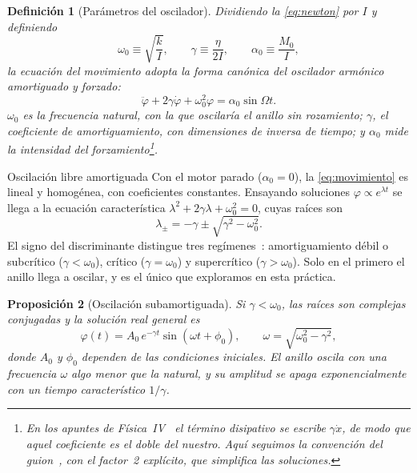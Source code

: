 \documentclass[a4paper,11pt]{amsart}
\makeatletter
\def\subsection{\@startsection{subsection}{2}%
  \z@{.9\linespacing\@plus.6\linespacing}{.3\linespacing}%
  {\normalfont\bfseries\color{azulprof}}}
\numberwithin{equation}{section}
\newcommand{\wz}{\omega_0}                    %
\newcommand{\wa}{\omega}                      %
\theoremstyle{cienplano}
\newtheorem{proposicion}{Proposición}[section]
\theoremstyle{ciendef}
\newtheorem{definicion}[proposicion]{Definición}
\theoremstyle{cienobs}
\makeatother
\begin{document}
\begin{definicion}[Parámetros del oscilador]\label{def:parametros}
Dividiendo la \cref{eq:newton} por $I$ y definiendo
\begin{equation}\label{eq:parametros}
  \wz\equiv\sqrt{\frac{k}{I}},\qquad
  \gamma\equiv\frac{\eta}{2I},\qquad
  \alpha_0\equiv\frac{M_0}{I},
\end{equation}
la ecuación del movimiento adopta la forma canónica del oscilador armónico
amortiguado y forzado:
\begin{equation}\label{eq:movimiento}
  \ddot\varphi+2\gamma\dot\varphi+\wz^{2}\varphi=\alpha_0\sin\Omega t .
\end{equation}
$\wz$ es la \emph{frecuencia natural}, con la que oscilaría el anillo sin
rozamiento; $\gamma$, el \emph{coeficiente de amortiguamiento}, con
dimensiones de inversa de tiempo; y $\alpha_0$ mide la intensidad del
forzamiento\footnote{En los apuntes de Física~IV~\cite{FIV} el término
disipativo se escribe $\gamma\dot x$, de modo que aquel coeficiente es el doble
del nuestro. Aquí seguimos la convención del guion~\cite{GUION-P4}, con el
factor~2 explícito, que simplifica las soluciones.}.
\end{definicion}

\subsection{Oscilación libre amortiguada}\label{sec:libre}
Con el motor parado ($\alpha_0=0$), la \cref{eq:movimiento} es lineal y
homogénea, con coeficientes constantes. Ensayando soluciones
$\varphi\propto e^{\lambda t}$ se llega a la ecuación característica
$\lambda^{2}+2\gamma\lambda+\wz^{2}=0$, cuyas raíces son
\begin{equation}\label{eq:raices}
  \lambda_{\pm}=-\gamma\pm\sqrt{\gamma^{2}-\wz^{2}} .
\end{equation}
El signo del discriminante distingue tres regímenes~\cite{FIV}: amortiguamiento
débil o subcrítico ($\gamma<\wz$), crítico ($\gamma=\wz$) y supercrítico
($\gamma>\wz$). Solo en el primero el anillo llega a oscilar, y es el único que
exploramos en esta práctica.

\begin{proposicion}[Oscilación subamortiguada]\label{prop:libre}
Si $\gamma<\wz$, las raíces son complejas conjugadas y la solución real general
es
\begin{equation}\label{eq:libre}
  \varphi(t)=A_0\,e^{-\gamma t}\sin(\wa t+\phi_0),\qquad
  \wa=\sqrt{\wz^{2}-\gamma^{2}},
\end{equation}
donde $A_0$ y $\phi_0$ dependen de las condiciones iniciales. El anillo oscila
con una frecuencia $\wa$ algo menor que la natural, y su amplitud se apaga
exponencialmente con un tiempo característico $1/\gamma$.
\end{proposicion}
\end{document}
